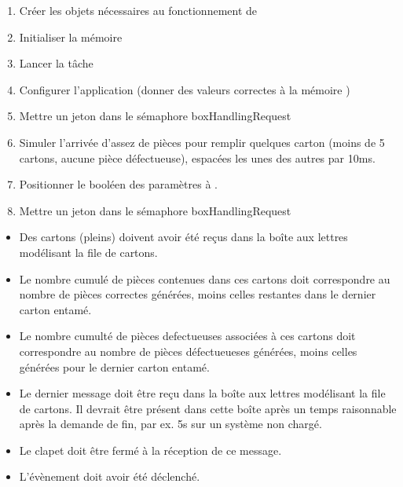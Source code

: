 {
\begin{enumerate}
	\item Créer les objets nécessaires au fonctionnement de 
	\item Initialiser la mémoire 
	\item Lancer la tâche 
	\item Configurer l'application (donner des valeurs correctes à la mémoire )
	\item Mettre un jeton dans le sémaphore boxHandlingRequest
	\item Simuler l'arrivée d'assez de pièces pour remplir quelques carton (moins de 5 cartons, aucune pièce défectueuse), espacées les unes des autres par 10ms.
	\item Positionner le booléen  des paramètres à .
	\item Mettre un jeton dans le sémaphore boxHandlingRequest
\end{enumerate}
}
{
\begin{itemize}
	\item Des cartons (pleins) doivent avoir été reçus dans la boîte aux lettres modélisant la file de cartons.
	\item Le nombre cumulé de pièces contenues dans ces cartons doit correspondre au nombre de pièces correctes générées, moins celles restantes dans le dernier carton entamé.
	\item Le nombre cumulté de pièces defectueuses associées à ces cartons doit correspondre au nombre de pièces défectueueses générées, moins celles générées pour le dernier carton entamé.
	\item Le dernier message doit être reçu dans la boîte aux lettres modélisant la file de cartons. Il devrait être présent dans cette boîte après un temps raisonnable après la demande de fin, par ex. 5s sur un système non chargé.
	\item Le clapet doit être fermé à la réception de ce message.
	\item L'évènement  doit avoir été déclenché.
\end{itemize}
}

